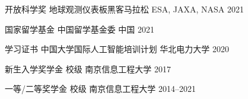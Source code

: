 


\begin{cvhonors}

  \cvhonor
    {开放科学奖} %
    {地球观测仪表板黑客马拉松} %
    {ESA, JAXA, NASA} %
    {2021} %

  \cvhonor
    {国家留学基金} %
    {中国留学基金委} %
    {中国} %
    {2021} %

  \cvhonor
    {学习证书} %
    {中国大学国际人工智能培训计划} %
    {华北电力大学} %
    {2020} %

  \cvhonor
    {新生入学奖学金} %
    {校级} %
    {南京信息工程大学} %
    {2017} %

  \cvhonor
    {一等/二等奖学金} %
    {校级} %
    {南京信息工程大学} %
    {2014--2021} %

\end{cvhonors}

